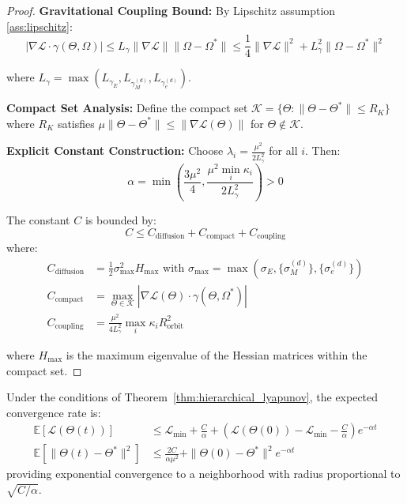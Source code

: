 \begin{proof}
\textbf{Gravitational Coupling Bound:} By Lipschitz assumption \ref{ass:lipschitz}:
$$|\nabla \mathcal{L} \cdot \gamma(\Theta, \Omega)| \leq L_\gamma \|\nabla \mathcal{L}\| \|\Omega - \Omega^*\| \leq \frac{1}{4}\|\nabla \mathcal{L}\|^2 + L_\gamma^2 \|\Omega - \Omega^*\|^2$$

where $L_\gamma = \max(L_{\gamma_E}, L_{\gamma_M^{(d)}}, L_{\gamma_e^{(d)}})$.

\textbf{Compact Set Analysis:} Define the compact set $\mathcal{K} = \{\Theta : \|\Theta - \Theta^*\| \leq R_K\}$ where $R_K$ satisfies $\mu \|\Theta - \Theta^*\| \leq \|\nabla \mathcal{L}(\Theta)\|$ for $\Theta \notin \mathcal{K}$.

\textbf{Explicit Constant Construction:}
Choose $\lambda_i = \frac{\mu^2}{2L_\gamma^2}$ for all $i$. Then:
$$\alpha = \min\left(\frac{3\mu^2}{4}, \frac{\mu^2 \min_i \kappa_i}{2L_\gamma^2}\right) > 0$$

The constant $C$ is bounded by:
$$C \leq C_{\text{diffusion}} + C_{\text{compact}} + C_{\text{coupling}}$$
where:
\begin{align}
C_{\text{diffusion}} &= \frac{1}{2}\sigma_{\max}^2 H_{\max} \text{ with } \sigma_{\max} = \max(\sigma_E, \{\sigma_M^{(d)}\}, \{\sigma_e^{(d)}\}) \\
C_{\text{compact}} &= \max_{\Theta \in \mathcal{K}} |\nabla \mathcal{L}(\Theta) \cdot \gamma(\Theta, \Omega^*)| \\
C_{\text{coupling}} &= \frac{\mu^2}{4L_\gamma^2} \max_i \kappa_i R_{\text{orbit}}^2
\end{align}

where $H_{\max}$ is the maximum eigenvalue of the Hessian matrices within the compact set.
\end{proof}

\begin{corollary}
\label{cor:convergence_rates}
Under the conditions of Theorem~\ref{thm:hierarchical_lyapunov}, the expected convergence rate is:
\begin{align}
\mathbb{E}[\mathcal{L}(\Theta(t))] &\leq \mathcal{L}_{\text{min}} + \frac{C}{\alpha} + \left(\mathcal{L}(\Theta(0)) - \mathcal{L}_{\text{min}} - \frac{C}{\alpha}\right) e^{-\alpha t}\\
\mathbb{E}[\|\Theta(t) - \Theta^*\|^2] &\leq \frac{2C}{\alpha\mu^2} + \|\Theta(0) - \Theta^*\|^2 e^{-\alpha t}
\end{align}
providing exponential convergence to a neighborhood with radius proportional to $\sqrt{C/\alpha}$.
\end{corollary}

